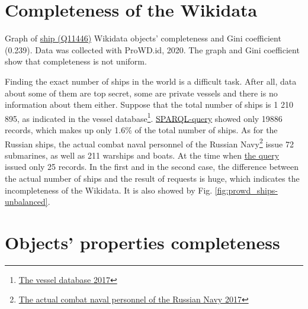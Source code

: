 


\section{Completeness of the Wikidata}

\begin{marginfigure}[0.0cm]
  {
    \setlength{\fboxsep}{0pt}%
    \setlength{\fboxrule}{1pt}%
  }
  \caption{
    Graph of \href{https://www.wikidata.org/wiki/Q11446}{ship (Q11446)} Wikidata objects' completeness and Gini coefficient (0.239). Data was collected with ProWD.id, 2020. The graph and Gini coefficient show that completeness is not uniform.
    }%
    \label{fig:prowd_ships-unbalanced}%
\end{marginfigure}


Finding the exact number of ships in the world is a difficult task. After all, data about some of them are top secret, some are private vessels and there is no information about them either. Suppose that the total number of ships is 1 210 895, as indicated in the vessel database\footnote{\href{http://www.fleetmon.com/vessels}{The vessel database 2017}}. \href{https://w.wiki/koU}{SPARQL-query} showed only \num{19886} records, which makes up only 1.6\% of the total number of ships. As for the Russian ships, the actual combat naval personnel of the Russian Navy\footnote{\href{http://russianships.info/today/}{The actual combat naval personnel of the Russian Navy 2017}} issue 72 submarines, as well as 211 warships and boats. At the time when \href{https://w.wiki/koS}{the query} issued only 25 records. In the first and in the second case, the difference between the actual number of ships and the result of requests is huge, which indicates the incompleteness of the Wikidata. It is also showed by Fig. \ref{fig:prowd_ships-unbalanced}.



\section{Objects' properties completeness}

